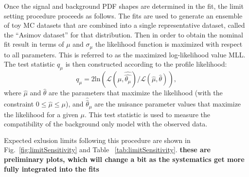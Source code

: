 Once the signal and background PDF shapes are determined in the fit,
the limit setting procedure proceeds as follows.  The fits are used to generate
an ensemble of toy MC datasets
that are combined into a single representative dataset, called the ``Asimov
dataset'' for that distribution.  Then 
in order to obtain the nominal fit result in terms of $\mu$ and $\sigma_{\mu}$
the likelihood function is maximized with respect to all parameters.
This is referred to as the maximized log-likelihood value MLL.
The test statistic $q_\mu$ is then constructed according to
the profile likelihood:
\begin{equation}
q_\mu = 2 \mathrm{ln} (\mathcal{L} (\mu,
\hat{\hat{\theta_\mu}})/\mathcal{L} (\hat{\mu}, \hat{\theta})), 
\end{equation}
where
$\hat{\mu}$ and $\hat{\theta}$ are the parameters that maximize the
likelihood (with the constraint $0 \leq \hat{\mu} \leq \mu$), and
$\hat{\hat{\theta}}_\mu$ are the nuisance parameter values that maximize the
likelihood for a given $\mu$. This test statistic is used to measure
the compatibility of the background only model with the observed
data. 

Expected exlusion limits following this procedure are shown in Fig.~\ref{fig:limitSensitivity} and Table
~\ref{tab:limitSensitivity}. %
\textbf{these are preliminary plots, which will change a bit as the 
systematics get more fully integrated into the fits}

